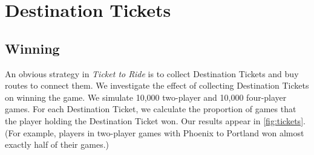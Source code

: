 \newpage
\section{Destination Tickets}

\subsection{Winning}
An obvious strategy in \textit{Ticket to Ride} is to collect
Destination Tickets and buy routes to connect them.
We investigate the effect of collecting Destination Tickets
on winning the game.
We simulate 10,000 two-player and 10,000 four-player games.
For each Destination Ticket, we calculate the proportion of 
games that the player holding the Destination Ticket won.
Our results appear in \cref{fig:tickets}.
(For example, players in two-player games with Phoenix to Portland
won almost exactly half of their games.)

